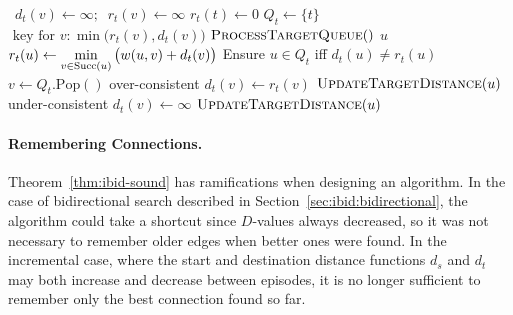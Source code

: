 {\begin{algorithm}[t]
\begin{minipage}[t]{8.2cm}
\begin{algorithmic}[1]
               \EndFor
            \EndIf
         \EndProcedure
      \end{algorithmic}
   \end{minipage}
   \quad
   \begin{minipage}[t]{8.2cm}
      \begin{algorithmic}[1]
          {\,\!}
               \State $d_t(v) \gets \infty; \;\; r_t(v) \gets \infty$
            \EndFor
            \State $r_t(t) \gets 0$
            \State $Q_t \gets \{ t \}$
               \Comment $\mbox{ key for } v: \min\big(r_t(v),d_t(v)\big)$
            \State $\mbox{\sc ProcessTargetQueue}()$
         \EndProcedure
          {$u$}
               \State $r_t(u) \gets \displaystyle\min_{v \in \mbox{\scriptsize Succ}(u)}
                  \big( w(u,v) + d_t(v) \big)$
            \EndIf
            \State Ensure $u \in Q_t$ iff $d_t(u) \neq r_t(u)$
         \EndProcedure
          {\,\!}
            \State $v \gets Q_t.\mbox{Pop}()$
                  \Comment over-consistent
               \State $d_t(v) \gets r_t(v)$
                  \State $\mbox{\sc UpdateTargetDistance}(u)$
               \EndFor
            \Else
                  \Comment under-consistent
               \State $d_t(v) \gets \infty$
                  \State $\mbox{\sc UpdateTargetDistance}(u)$
               \EndFor
            \EndIf
         \EndProcedure
      \end{algorithmic}
   \end{minipage}
\end{algorithm}
} %

\paragraph{Remembering Connections.}
Theorem~\ref{thm:ibid-sound} has ramifications when designing
an algorithm.
In the case of bidirectional search
described in Section~\ref{sec:ibid:bidirectional},
the algorithm could take a shortcut since $D$-values always decreased,
so it was not necessary to remember older edges when better
ones were found.
In the incremental case,
where the start and destination distance functions $d_s$ and $d_t$
may both increase and decrease between episodes,
it is no longer sufficient to remember only the best connection
found so far.

